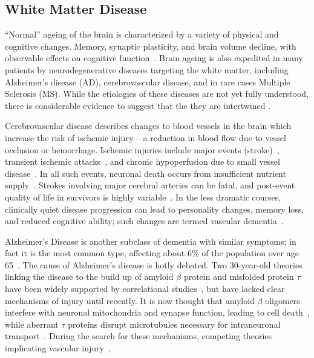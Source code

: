 \subsection{White Matter Disease}\label{ss:WMD}
``Normal'' ageing of the brain is characterized by a variety of physical and cognitive changes.
Memory, synaptic plasticity, and brain volume decline,
with observable effects on cognitive function~\cite{Peters2006,Good2002}.
Brain ageing is also expedited in many patients by neurodegenerative diseases
targeting the white matter, including
Alzheimer's disease (AD), cerebrovascular disease, and in rare cases Multiple Sclerosis (MS).
While the etiologies of these diseases are not yet fully understood,
there is considerable evidence to suggest that the they are intertwined
\cite{Debette2010,Conklin2014,Heppner2015,Snyder2015}.
\par
Cerebrovascular disease describes changes to blood vessels in the brain which increase the risk of
ischemic injury -- a reduction in blood flow due to vessel occlusion or hemorrhage.
Ischemic injuries include
major events (stroke)~\cite{VanderWorp2007},
transient ischemic attacks~\cite{Albers2002}, and
chronic hypoperfusion due to small vessel disease~\cite{Pantoni2010}.
In all such events, neuronal death occurs from insufficient nutrient supply~\cite{VanderWorp2007}.
Strokes involving major cerebral arteries can be fatal,
and post-event quality of life in survivors is highly variable~\cite{Prabhakaran2015}.
In the less dramatic courses, clinically quiet disease progression can lead to
personality changes, memory loss, and reduced cognitive ability;
such changes are termed vascular dementia~\cite{Roman1993}.
\par
Alzheimer's Disease is another subclass of dementia with similar symptoms;
in fact it is the most common type,
affecting about 6\% of the population over age 65~\cite{Burns2009}.
The cause of Alzheimer's disease is hotly debated.
Two 30-year-old theories linking the disease to
the build up of amyloid $\beta$ protein and misfolded protein $\tau$
have been widely supported by correlational studies~\cite{Masters1985,Hardy2002,Lee2011},
but have lacked clear mechanisms of injury until recently.
It is now thought that amyloid $\beta$ oligomers interfere with
neuronal mitochondria and synapse function, leading to cell death~\cite{Kim2013,Tu2014},
while aberrant $\tau$ proteins disrupt microtubules
necessary for intraneuronal transport~\cite{Lee2011}.
During the search for these mechanisms, competing theories implicating
vascular injury~\cite{Snyder2015},
